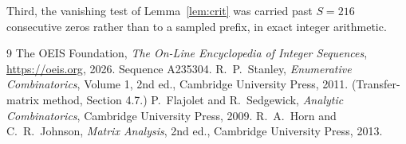 \documentclass[11pt,a4paper]{article}
\theoremstyle{plain}
\theoremstyle{definition}
\begin{document}
Third, the vanishing test of Lemma~\ref{lem:crit} was carried past $S=216$ consecutive
zeros rather than to a sampled prefix, in exact integer arithmetic.

\begin{thebibliography}{9}
 The OEIS Foundation, \emph{The On-Line Encyclopedia of Integer
Sequences}, \url{https://oeis.org}, 2026. Sequence A235304.
 R.~P.~Stanley, \emph{Enumerative Combinatorics}, Volume 1, 2nd ed.,
Cambridge University Press, 2011. (Transfer-matrix method, Section 4.7.)
 P.~Flajolet and R.~Sedgewick, \emph{Analytic Combinatorics}, Cambridge
University Press, 2009.
 R.~A.~Horn and C.~R.~Johnson, \emph{Matrix Analysis}, 2nd ed., Cambridge
University Press, 2013.
\end{thebibliography}
\end{document}
